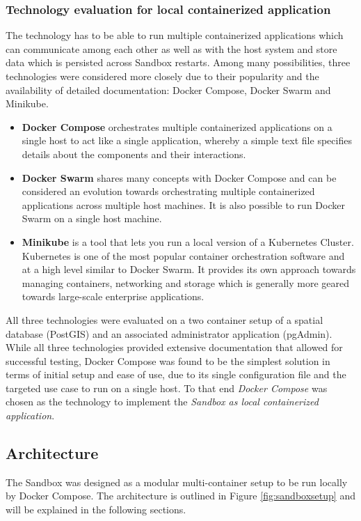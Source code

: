 \documentclass[11pt, a4paper, oneside, parskip=full-]{scrartcl}
\begin{document}
\subsubsection{Technology evaluation for local containerized application}
The technology has to be able to run multiple containerized applications which
can communicate among each other as well as with the host system and store data
which is persisted across Sandbox restarts. Among many possibilities, three
technologies were considered more closely due to their popularity and the
availability of detailed documentation: Docker Compose, Docker Swarm and
Minikube.

\begin{itemize}
  \item \textbf{Docker Compose} orchestrates multiple containerized applications
  on a single host to act like a single application, whereby a simple text file
  specifies details about the components and their interactions.
  \item \textbf{Docker Swarm}\cite{dockerswarm} shares many concepts with Docker
  Compose and can be considered an evolution towards orchestrating multiple
  containerized applications across multiple host machines. It is also possible
  to run Docker Swarm on a single host machine.
  \item \textbf{Minikube}\cite{minikube} is a tool that lets you run a local
  version of a Kubernetes Cluster. Kubernetes is one of the most popular
  container orchestration software and at a high level similar to Docker Swarm.
  It provides its own approach towards managing containers, networking and
  storage which is generally more geared towards large-scale enterprise
  applications.
\end{itemize}

All three technologies were evaluated on a two container setup of a spatial
database (PostGIS) and an associated administrator application (pgAdmin). While
all three technologies provided extensive documentation that allowed for
successful testing, Docker Compose was found to be the simplest solution in
terms of initial setup and ease of use, due to its single configuration file and
the targeted use case to run on a single host. To that end \emph{Docker Compose}
was chosen as the technology to implement the \emph{Sandbox as local
containerized application}.

\subsection{Architecture}
The Sandbox was designed as a modular multi-container setup to be run locally by
Docker Compose. The architecture is outlined in Figure \ref{fig:sandboxsetup}
and will be explained in the following sections. \\
\end{document}
